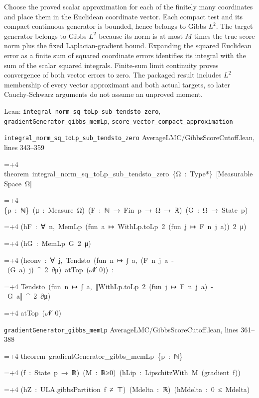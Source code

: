 \documentclass[11pt,a4paper]{report}
\newlength{\leancharwidth}
\newenvironment{leancode}{\par\smallskip\begingroup\ttfamily\footnotesize\raggedright
  \settowidth{\leancharwidth}{M}\setlength{\parskip}{0pt}\setlength{\parindent}{0pt}
  \frenchspacing}{\par\endgroup\smallskip}
\newcommand{\leanline}[2]{\hangindent=\dimexpr#1\leancharwidth+4\leancharwidth\relax
  \hangafter=1\noindent\hspace*{#1\leancharwidth}#2\par}
\newcommand{\leansource}[1]{\par{\footnotesize\color{leanmuted}#1}\par}
\begin{document}
Choose the proved scalar approximation for each of the finitely many coordinates and place them in the Euclidean coordinate vector. Each compact test and its compact continuous generator is bounded, hence belongs to Gibbs \(L^{2}\). The target generator belongs to Gibbs \(L^{2}\) because its norm is at most \(M\) times the true score norm plus the fixed Laplacian-gradient bound. Expanding the squared Euclidean error as a finite sum of squared coordinate errors identifies its integral with the sum of the scalar squared integrals. Finite-sum limit continuity proves convergence of both vector errors to zero. The packaged result includes \(L^{2}\) membership of every vector approximant and both actual targets, so later Cauchy-Schwarz arguments do not assume an unproved moment.

\begin{leanbox}{Lean: \texttt{integral\_\allowbreak{}norm\_\allowbreak{}sq\_\allowbreak{}toLp\_\allowbreak{}sub\_\allowbreak{}tendsto\_\allowbreak{}zero}, \texttt{gradientGenerator\_\allowbreak{}gibbs\_\allowbreak{}memLp}, \texttt{score\_\allowbreak{}vector\_\allowbreak{}compact\_\allowbreak{}approximation}}
\leansource{\texttt{integral\_\allowbreak{}norm\_\allowbreak{}sq\_\allowbreak{}toLp\_\allowbreak{}sub\_\allowbreak{}tendsto\_\allowbreak{}zero} \quad AverageLMC/\allowbreak{}GibbsScoreCutoff.lean, lines 343–359}
\begin{leancode}
\leanline{0}{theorem\ integral\_norm\_sq\_toLp\_sub\_tendsto\_zero\ \{Ω\ :\ Type*\}\ [MeasurableSpace\ Ω]}
\leanline{4}{\{p\ :\ ℕ\}\ (μ\ :\ Measure\ Ω)\ (F\ :\ ℕ\ →\ Fin\ p\ →\ Ω\ →\ ℝ)\ (G\ :\ Ω\ →\ State\ p)}
\leanline{4}{(hF\ :\ ∀\ n,\ MemLp\ (fun\ a\ ↦\ WithLp.toLp\ 2\ (fun\ j\ ↦\ F\ n\ j\ a))\ 2\ μ)}
\leanline{4}{(hG\ :\ MemLp\ G\ 2\ μ)}
\leanline{4}{(hconv\ :\ ∀\ j,\ Tendsto\ (fun\ n\ ↦\ ∫\ a,\ (F\ n\ j\ a\ -\ (G\ a)\ j)\ \textasciicircum{}\ 2\ ∂μ)\ atTop\ ({\leanfallback 𝓝}\ 0))\ :}
\leanline{4}{Tendsto\ (fun\ n\ ↦\ ∫\ a,\ ‖WithLp.toLp\ 2\ (fun\ j\ ↦\ F\ n\ j\ a)\ -\ G\ a‖\ \textasciicircum{}\ 2\ ∂μ)}
\leanline{6}{atTop\ ({\leanfallback 𝓝}\ 0)}
\end{leancode}
\leansource{\texttt{gradientGenerator\_\allowbreak{}gibbs\_\allowbreak{}memLp} \quad AverageLMC/\allowbreak{}GibbsScoreCutoff.lean, lines 361–388}
\begin{leancode}
\leanline{0}{theorem\ gradientGenerator\_gibbs\_memLp\ \{p\ :\ ℕ\}}
\leanline{4}{(f\ :\ State\ p\ →\ ℝ)\ (M\ :\ ℝ≥0)\ (hLip\ :\ LipschitzWith\ M\ (gradient\ f))}
\leanline{4}{(hZ\ :\ ULA.gibbsPartition\ f\ ≠\ ⊤)\ (Mdelta\ :\ ℝ)\ (hMdelta\ :\ 0\ ≤\ Mdelta)}

\end{leancode}
\end{leanbox}
\end{document}

